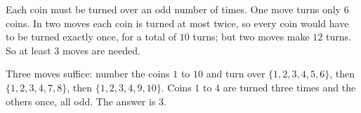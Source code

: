 Each coin must be turned over an odd number of times. One move turns only $6$ coins. In two moves each coin is turned at most twice, so every coin would have to be turned exactly once, for a total of $10$ turns; but two moves make $12$ turns. So at least $3$ moves are needed.

Three moves suffice: number the coins $1$ to $10$ and turn over $\{1,2,3,4,5,6\}$, then $\{1,2,3,4,7,8\}$, then $\{1,2,3,4,9,10\}$. Coins $1$ to $4$ are turned three times and the others once, all odd. The answer is $\boxed{3}$.
